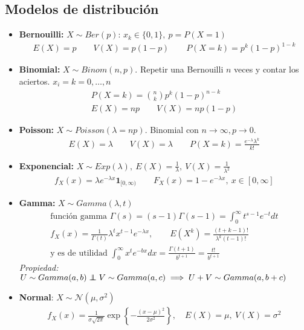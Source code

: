 \documentclass[a4paper,twocolumn]{extarticle}
\theoremstyle{remark}
\newcommand\indep{\protect\mathpalette{\protect\independenT}{\perp}}
\def\independenT#1#2{\mathrel{\rlap{$#1#2$}\mkern2mu{#1#2}}}
\newcommand{\normal}{\mathcal{N}}
\begin{document}
\subsection{Modelos de distribución}

\begin{itemize}
	\item \textbf{Bernouilli:} $X \sim Ber(p)$: $x_k \in \{0,1\},\ p = P(X = 1)$
	\begin{align*}
	E(X) = p\qquad V(X) = p(1-p) \qquad P(X = k) = p^k(1-p)^{1-k}
	\end{align*}
	\item \textbf{Binomial:} $X \sim Binom(n,p)$. Repetir una Bernouilli $n$ veces y contar los aciertos. $x_i = k = 0, \dots, n$
	\begin{align*}P(X = k) = \binom{n}{k}p^k(1-p)^{n-k}\\
	E(X) = np \qquad V(X) = np(1-p)
	\end{align*}
	\item \textbf{Poisson:} $X \sim Poisson(\lambda = np)$. Binomial con $n \to \infty, p \to 0$.
	\begin{align*}
	E(X) = \lambda \qquad V(X) = \lambda \qquad P(X = k) = \frac{e^{-\lambda}\lambda^k}{k!}
	\end{align*}
	\item \textbf{Exponencial:} $X \sim Exp(\lambda),\ E(X) = \frac{1}{\lambda},\ V(X) = \frac{1}{\lambda^2}$
	\begin{align*}
	f_X(x) = \lambda e^{-\lambda x}\mathbf{1}_{[0,\infty)} \qquad F_X(x) = 1 - e^{-\lambda x},\ x \in [0, \infty]
	\end{align*}
	\item \textbf{Gamma:} $X \sim Gamma(\lambda, t)$
	\begin{align*}
	\text{función gamma } \Gamma(s) = (s-1)\Gamma(s-1) = \int_{0}^{\infty} t^{s-1}e^{-t}dt\\
	f_X(x) = \frac{1}{\Gamma(t)}\lambda^tx^{t-1}e^{-\lambda x},\qquad E(X^k) = \frac{(t+k-1)!}{\lambda^k(t-1)!} \\
	\text{y es de utilidad }\int_{0}^{\infty}x^{t}e^{-bx}dx = \frac{\Gamma(t + 1)}{b^{t+1}} = \frac{t!}{b^{t+1}}
	\end{align*}
	\textit{Propiedad:} $U \sim Gamma(a, b) \indep V \sim Gamma(a, c) \implies U + V \sim Gamma(a, b+c)$
	\item \textbf{Normal}: $X \sim \normal(\mu, \sigma^2)$
	\begin{align*}
	f_X(x) = \frac{1}{\sigma\sqrt{2\pi}}\exp\left\lbrace-\frac{(x-\mu)^2}{2\sigma^2}\right\rbrace, \quad E(X) = \mu,\ V(X) = \sigma^2
	\end{align*}
\end{itemize}
\end{document}
